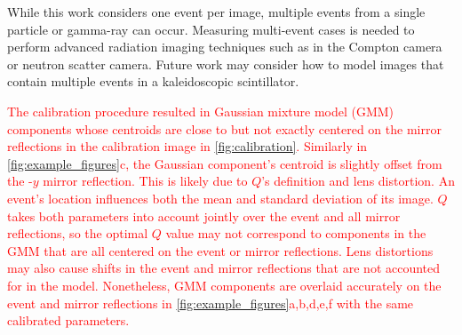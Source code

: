 While this work considers one event per image, multiple events from a single 
particle or gamma-ray can occur. 
Measuring multi-event cases is needed to perform advanced radiation imaging 
techniques such as in the Compton camera or neutron scatter camera.
Future work may consider how to model images that contain multiple events in a 
kaleidoscopic scintillator.

\textcolor{red}{The calibration procedure resulted in Gaussian mixture model (GMM) components 
whose centroids are close to but not exactly centered on the mirror reflections in 
the calibration image in \cref{fig:calibration}.
Similarly in \cref{fig:example_figures}c, the Gaussian component's centroid is 
slightly offset from the -$y$ mirror reflection.
This is likely due to $Q$'s definition and lens distortion.
An event's location influences both the mean and standard deviation of its image.
$Q$ takes both parameters into account jointly over the event and all mirror 
reflections, so the optimal $Q$ value may not correspond to components in the GMM 
that are all centered on the event or mirror reflections.
Lens distortions may also cause shifts in the event and mirror reflections that 
are not accounted for in the model.
Nonetheless, GMM components are overlaid accurately on the event and mirror 
reflections in \cref{fig:example_figures}a,b,d,e,f with the same calibrated parameters.}

\iffalse
\textcolor{red}{
While this work models one event, multiple events from a single particle or 
gamma-ray can occur. 
For example, a neutron or gamma-ray can scatter one or more times before exiting 
or being absorbed in the scintillator.
Measuring a pair of scatter-absorption events from a single particle forms the 
basis for backprojection to determine the particle's trajectory and the radiation 
source's location.
In general, the ability to measure multiple, simultaneous events allows to 
accurately measure how and where a particle interacted in the scintillator.
Adequate energy, spatial, and time resolutions are required to perform the Compton backprojection.
SPAD camera designs have sufficient spatial and time resolutions, but 
they are limited by low light collection.
Now, the kaleidoscopic scintillator may provide the light collection levels needed 
to perform these advanced techniques with a SPAD camera.
Future work may consider how to model images that contain multiple events in a 
kaleidoscopic scintillator.
}
\fi
